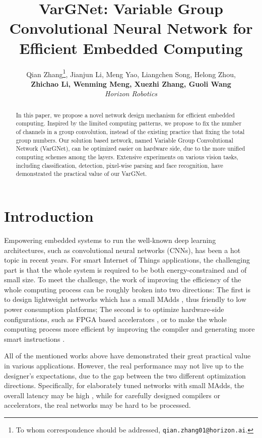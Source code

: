 \documentclass{article}
\title{VarGNet: Variable Group Convolutional Neural Network for Efficient Embedded Computing}
\author{Qian Zhang\thanks{To whom correspondence should be addressed, \texttt{qian.zhang01@horizon.ai}.}, 
Jianjun Li, Meng Yao, Liangchen Song, Helong Zhou, \\ 
\textbf{Zhichao Li, Wenming Meng, Xuezhi Zhang, Guoli Wang}\\
\textit{Horizon Robotics}
}
\begin{document}
\maketitle

\begin{abstract}
In this paper, we propose a novel network design mechanism for efficient embedded computing. Inspired by the limited computing patterns, we propose to fix the number of channels in a group convolution, instead of the existing practice that fixing the total group numbers. Our solution based network, named Variable Group Convolutional Network (VarGNet), can be optimized easier on hardware side, due to the more unified computing schemes among the layers. Extensive experiments on various vision tasks, including classification, detection, pixel-wise parsing and face recognition, have demonstrated the practical value of our VarGNet.
\end{abstract}

\section{Introduction}
Empowering embedded systems to run the well-known deep learning architectures, such as convolutional neural networks (CNNs), has been a hot topic in recent years. For smart Internet of Things applications, the challenging part is that the whole system is required to be both energy-constrained and of small size. To meet the challenge, the work of improving the efficiency of the whole computing process can be roughly broken into two directions: The first is to design lightweight networks which has a small MAdds \cite{howard2017mobilenets, sandler2018mobilenetv2, zhang2018shufflenet, ma2018shufflenet}, thus friendly to low power consumption platforms; The second is to optimize hardware-side configurations, such as FPGA based accelerators \cite{FarabetPHL09, ZhangLSGXC15}, or to make the whole computing process more efficient by improving the compiler and generating more smart instructions \cite{abdelfattah2018dla, chen2018tvm, xing2019dnnvm}. 

All of the mentioned works above have demonstrated their great practical value in various applications. However, the real performance may not live up to the designer's expectations, due to the gap between the two different optimization directions. Specifically, for elaborately tuned networks with small MAdds, the overall latency may be high \cite{ma2018shufflenet}, while for carefully designed compilers or accelerators, the real networks may be hard to be processed. 
\end{document}
